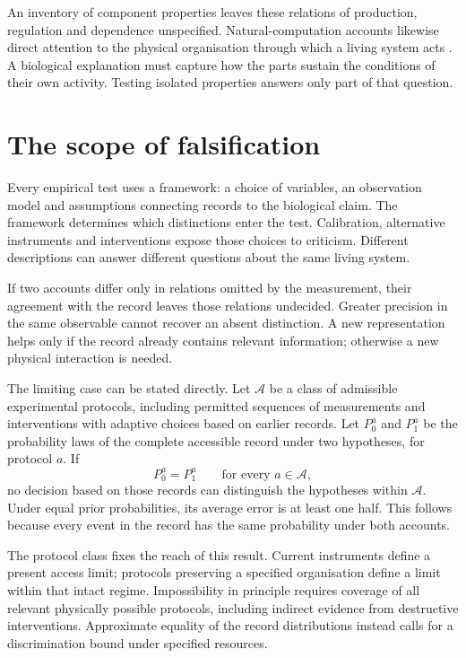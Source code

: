 \documentclass[10pt,twocolumn]{article}
\begin{document}
An inventory of component properties leaves these relations of production, regulation and dependence unspecified. Natural-computation accounts likewise direct attention to the physical organisation through which a living system acts \citep{igamberdiev2021}. A biological explanation must capture how the parts sustain the conditions of their own activity. Testing isolated properties answers only part of that question.

\section{The scope of falsification}

Every empirical test uses a framework: a choice of variables, an observation model and assumptions connecting records to the biological claim. The framework determines which distinctions enter the test. Calibration, alternative instruments and interventions expose those choices to criticism. Different descriptions can answer different questions about the same living system.

If two accounts differ only in relations omitted by the measurement, their agreement with the record leaves those relations undecided. Greater precision in the same observable cannot recover an absent distinction. A new representation helps only if the record already contains relevant information; otherwise a new physical interaction is needed.

The limiting case can be stated directly. Let \(\mathcal A\) be a class of admissible experimental protocols, including permitted sequences of measurements and interventions with adaptive choices based on earlier records. Let \(P_0^a\) and \(P_1^a\) be the probability laws of the complete accessible record under two hypotheses, for protocol \(a\). If
\begin{equation}
P_0^a=P_1^a\qquad\text{for every }a\in\mathcal A,
\label{eq:access}
\end{equation}
no decision based on those records can distinguish the hypotheses within \(\mathcal A\). Under equal prior probabilities, its average error is at least one half. This follows because every event in the record has the same probability under both accounts.

The protocol class fixes the reach of this result. Current instruments define a present access limit; protocols preserving a specified organisation define a limit within that intact regime. Impossibility in principle requires coverage of all relevant physically possible protocols, including indirect evidence from destructive interventions. Approximate equality of the record distributions instead calls for a discrimination bound under specified resources.
\end{document}
